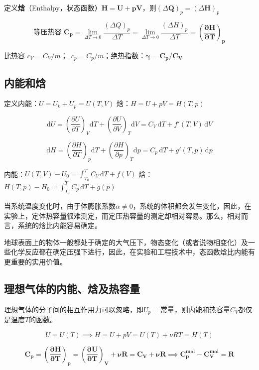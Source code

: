 \documentclass[UTF8]{ctexart}
\theoremstyle{definition}
\begin{document}
定义\textbf{焓}（Enthalpy，状态函数）$\boldsymbol{H = U + pV}$，则$(\Delta \boldsymbol{Q})_p = (\Delta \boldsymbol{H})_p$

\[
\text{等压热容 }\boldsymbol{C_p} = \lim_{\Delta T \to 0}\frac{(\Delta Q)_p}{\Delta T} = \lim_{\Delta T \to 0}\frac{(\Delta H)_p}{\Delta T} = \boldsymbol{\left(\frac{\partial H}{\partial T}\right)_p}
\]

比热容 $c_V = C_V/m$；\ $c_p = C_p/m$；\qquad 绝热指数：$\boldsymbol{\gamma = C_p/C_V}$


\subsection{内能和焓}

定义内能：$U = U_k + U_p = U(T,V)$ \qquad 焓：$H = U + pV = H(T,p)$

\[
\mathrm{d}U = \left(\frac{\partial U}{\partial T}\right)_V \mathrm{d}T + \left(\frac{\partial U}{\partial V}\right)_T \mathrm{d}V = C_V\,\mathrm{d}T + f'(T,V)\,\mathrm{d}V
\]

\[
\mathrm{d}H = \left(\frac{\partial H}{\partial T}\right)_p \mathrm{d}T + \left(\frac{\partial H}{\partial p}\right)_T \mathrm{d}p = C_p\,\mathrm{d}T + g'(T,p)\,\mathrm{d}p
\]

内能：$U(T,V) - U_0 = \displaystyle\int_{T_0}^{T} C_V\,\mathrm{d}T + f(V)$ \quad 焓：$H(T,p) - H_0 = \displaystyle\int_{T_0}^{T} C_p\,\mathrm{d}T + g(p)$

当系统温度变化时，由于体膨胀系数$\alpha \neq 0$，系统的体积都会发生变化，因此，在实验上，定体热容量很难测定，而定压热容量的测定却相对容易。那么，相对而言，系统的焓比内能容易确定。

地球表面上的物体一般都处于确定的大气压下，物态变化（或者说物相变化）及一些化学反应都在确定压强下进行，因此，在实验和工程技术中，态函数焓比内能有更重要的实用价值。


\subsection{理想气体的内能、焓及热容量}

理想气体的分子间的相互作用力可以忽略，即$U_p = \text{常量}$，则内能和热容量$C_V$都仅是温度$T$的函数。

\[
U = U(T) \implies H = U + pV = U(T) + \nu RT = H(T)
\]

\[
\boldsymbol{C_p = \left(\frac{\partial H}{\partial T}\right)_p = \left(\frac{\partial U}{\partial T}\right)_V + \nu R = C_V + \nu R} \implies \boldsymbol{C_p^{mol} - C_V^{mol} = R}
\]
\end{document}
